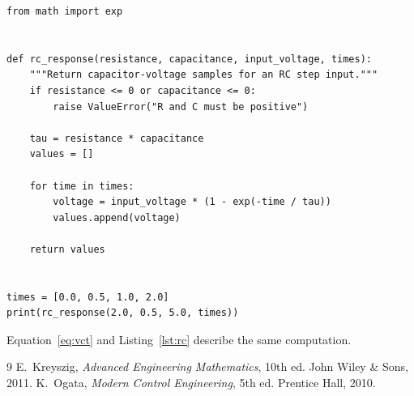 \documentclass[10pt]{article}
\begin{document}
\begin{lstlisting}[style=py, caption={Computing samples of the RC step response.}, label={lst:rc}]
from math import exp


def rc_response(resistance, capacitance, input_voltage, times):
    """Return capacitor-voltage samples for an RC step input."""
    if resistance <= 0 or capacitance <= 0:
        raise ValueError("R and C must be positive")

    tau = resistance * capacitance
    values = []

    for time in times:
        voltage = input_voltage * (1 - exp(-time / tau))
        values.append(voltage)

    return values


times = [0.0, 0.5, 1.0, 2.0]
print(rc_response(2.0, 0.5, 5.0, times))
\end{lstlisting}

Equation~\eqref{eq:vct} and Listing~\ref{lst:rc} describe the same
computation.

\begin{thebibliography}{9}
   E.~Kreyszig, \textit{Advanced Engineering
    Mathematics}, 10th ed. John Wiley \& Sons, 2011.
   K.~Ogata, \textit{Modern Control Engineering},
    5th ed. Prentice Hall, 2010.
\end{thebibliography}
\end{document}
